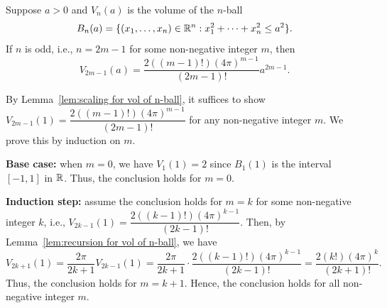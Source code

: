 \begin{propositionenv}
    Suppose $a>0$ and $V_n(a)$ is the volume of the $n$-ball
    $$ B_n(a) = \{(x_1, \ldots, x_n) \in \mathbb{R}^n : x_1^2 + \cdots + x_n^2 \leq a^2\}. $$
    If $n$ is odd, i.e., $n = 2m-1$ for some non-negative integer $m$, then
    $$ V_{2m-1}(a) = \frac{2((m-1)!) (4\pi)^{m-1}}{(2m-1)!} a^{2m-1}. $$
\end{propositionenv}
\begin{proofenv}
    By Lemma~\ref{lem:scaling for vol of n-ball}, it suffices to show $V_{2m-1}(1) = \dfrac{2((m-1)!) (4\pi)^{m-1}}{(2m-1)!}$ for any non-negative integer $m$. We prove this by induction on $m$. 

    \textbf{Base case:} when $m=0$, we have $V_1(1) = 2$ since $B_1(1)$ is the interval $[-1,1]$ in $\mathbb{R}$. Thus, the conclusion holds for $m=0$.
    
    \textbf{Induction step:} assume the conclusion holds for $m = k$ for some non-negative integer $k$, i.e., $V_{2k-1}(1) = \dfrac{2((k-1)!) (4\pi)^{k-1}}{(2k-1)!}$. Then, by Lemma~\ref{lem:recursion for vol of n-ball}, we have
    \[
    V_{2k+1}(1) = \frac{2\pi}{2k+1} V_{2k-1}(1) = \frac{2\pi}{2k+1} \cdot \frac{2((k-1)!) (4\pi)^{k-1}}{(2k-1)!} = \frac{2(k!) (4\pi)^k}{(2k+1)!}.
    \]
    Thus, the conclusion holds for $m = k+1$. Hence, the conclusion holds for all non-negative integer $m$.
\end{proofenv}